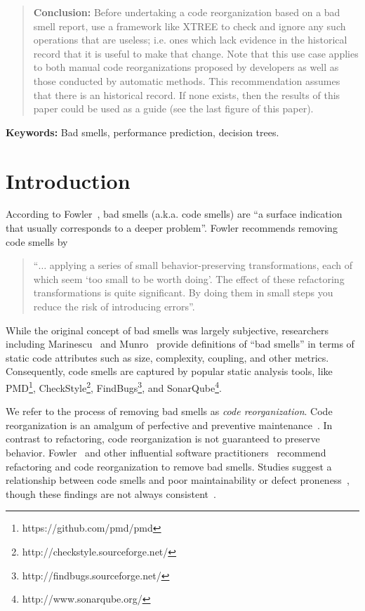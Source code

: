 \documentclass[twocolumn,5p]{elsarticle}
\theoremstyle{break}
\begin{document}
\begin{frontmatter}
\begin{abstract}
			\noindent
			{\bf Conclusion: }
			Before undertaking a code reorganization based on a bad smell 
			report, use a framework like XTREE to check and ignore any such 
			operations that  are useless; i.e. ones which lack evidence in the 
			historical record  that it is useful to make that change. Note 
			that 
			this use case applies to both manual code reorganizations proposed 
			by developers as well as those conducted by automatic methods. 
			This 
			recommendation assumes that there is an historical record. If none 
			exists, then the results of this paper could be used as a guide 
			(see the last figure of this paper).
			
			
		\end{abstract}
	\end{frontmatter}
	
	\vspace{1mm}
	\noindent
	{\bf Keywords:} Bad smells,
	performance prediction,  decision trees.
	
	
	
	
	\section{Introduction}
	\label{sect:intro}
	According to   Fowler~\cite{fowler99}, bad smells (a.k.a. code smells)
	are ``a surface indication that usually corresponds to a deeper problem''.
	Fowler  recommends   removing   code smells   by
	\begin{quote}
		``$\ldots$ applying a series of small behavior-preserving 
		transformations, 
		each
		of which seem `too small to be worth doing'.
		The  effect of   these refactoring transformations is quite 
		significant. By doing them in small steps you reduce the risk
		of introducing errors''.
	\end{quote}
	

	While the original concept of bad smells was largely subjective, 
	researchers including Marinescu~\cite{Lanza2006} and 
	Munro~\cite{munro2005product} provide definitions of ``bad smells'' in 
	terms of static code attributes such as size, complexity, coupling, and 
	other metrics. Consequently, code smells are captured by popular static 
	analysis tools, like PMD\footnote{https://github.com/pmd/pmd}, 
	CheckStyle\footnote{http://checkstyle.sourceforge.net/}, 
	FindBugs\footnote{http://findbugs.sourceforge.net/}, and 
	SonarQube\footnote{http://www.sonarqube.org/}.

        We refer to the process of removing bad smells as \textit{code 
	reorganization}. Code reorganization is an amalgum of perfective and 
	preventive maintenance~\cite{iso14764}. In contrast to refactoring, code 
	reorganization is not guaranteed to preserve behavior.
	Fowler~\cite{fowler99} and other influential software 
	practitioners~\cite{mcconnell2004code,horror} recommend refactoring and 
	code reorganization to remove bad smells. Studies suggest a relationship 
	between code smells and poor maintainability or defect 
	proneness~\cite{yamashita2013code,yama13,zazworka2011investigating}, though 
	these findings are not always consistent~\cite{olbrich2010all}.
	
\end{document}
